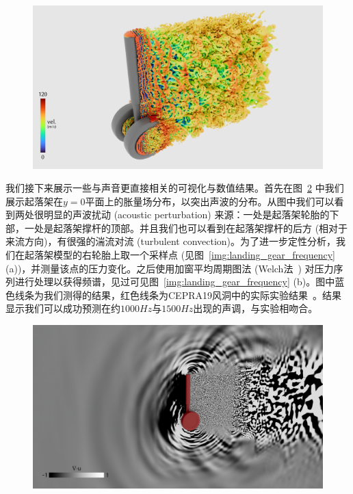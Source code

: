 \begin{figure}[!htbp]
  \centering
    \includegraphics[width=0.99\columnwidth]{figures/landing_gear_q_criterion.png}
  \label{img:landing_gear_q_criterion}
\end{figure}

我们接下来展示一些与声音更直接相关的可视化与数值结果。首先在图~\ref{img:landing_gear_divergence} 中我们展示起落架在$y=0$平面上的胀量场分布，以突出声波的分布。从图中我们可以看到两处很明显的声波扰动 (acoustic perturbation) 来源：一处是起落架轮胎的下部，一处是起落架撑杆的顶部。并且我们也可以看到在起落架撑杆的后方 (相对于来流方向)，有很强的湍流对流 (turbulent convection)。为了进一步定性分析，我们在起落架模型的右轮胎上取一个采样点 (见图~\ref{img:landing_gear_frequency} (a))，并测量该点的压力变化。之后使用加窗平均周期图法 (Welch法~\citep{1161901}) 对压力序列进行处理以获得频谱，见过可见图~\ref{img:landing_gear_frequency} (b)。图中蓝色线条为我们测得的结果，红色线条为CEPRA19风洞中的实际实验结果~\citep{doi:10.2514/6.2015-2993}。结果显示我们可以成功预测在约$1000Hz$与$1500Hz$出现的声调，与实验相吻合。

\begin{figure}[!htbp]
  \centering
    \includegraphics[width=0.99\columnwidth]{figures/landing_gear_divergence.png}
  \label{img:landing_gear_divergence}
\end{figure}

